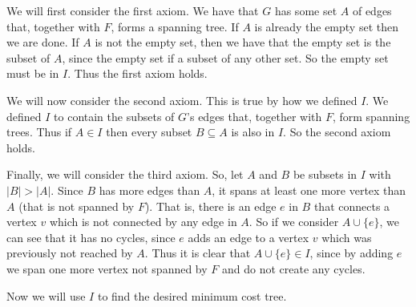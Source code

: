 \documentclass{article}
\begin{document}
\begin{description}
        We will first consider the first axiom. We have that $G$ has some set
        $A$ of edges that, together with $F$, forms a spanning tree. If $A$ is
        already the empty set then we are done. If $A$ is not the empty set, then
        we have that the empty set is the subset of $A$, since the empty set if
        a subset of any other set. So the empty set must be in $I$. Thus the
        first axiom holds.

        We will now consider the second axiom. This is true by how we defined
        $I$. We defined $I$ to contain the subsets of $G$'s edges that, together
        with $F$, form spanning trees. Thus if $A \in I$ then every subset $B
        \subseteq A$ is also in $I$. So the second axiom holds.

        Finally, we will consider the third axiom. So, let $A$ and $B$ be
        subsets in $I$ with $|B| > |A|$. Since $B$ has more edges than $A$, it
        spans at least one more vertex than $A$ (that is not spanned by $F$).
        That is, there is an edge $e$ in
        $B$ that connects a vertex $v$ which is not connected by any edge in
        $A$. So if we consider $A \cup \{e\}$, we can see that it has no cycles,
        since $e$ adds an edge to a vertex $v$ which was previously not reached
        by $A$. Thus it is clear that $A \cup \{e\} \in I$, since by adding $e$
        we span one more vertex not spanned by $F$ and do not create any cycles.

        \vspace{8mm}
        Now we will use $I$ to find the desired minimum cost tree.


\end{description}
\end{document}
